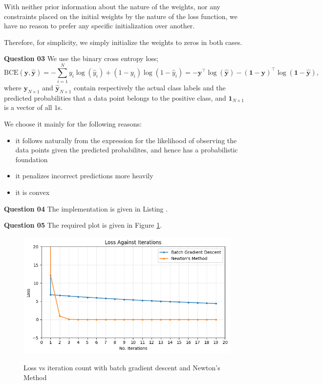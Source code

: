 \documentclass{article}[a4paper]
\begin{document}
	With neither prior information about the nature of the weights, nor any constraints placed on the initial weights by the nature of the loss function, we have no reason to prefer any specific initialization over another.
	
	Therefore, for simplicity, we simply initialize the weights to zeros in both cases.
	\medskip

	\textbf{Question 03} We use the binary cross entropy loss; \[
		\text{BCE}\left(\mathbf{y}, \hat{\mathbf{y}}\right)
		=
		-\sum_{i = 1}^N
			y_i \log\left( \hat{y}_i \right)
			+
			\left( 1 - y_i \right) \log\left( 1 - \hat{y}_i \right)
		=
		-\mathbf{y}^\top \log\left( \hat{\mathbf{y}} \right)
		-\left(\mathbf{1} - \mathbf{y}\right)^\top \log\left( \mathbf{1} - \hat{\mathbf{y}} \right),
	\]
	where $\mathbf{y}_{N \times 1}$ and $\hat{\mathbf{y}}_{N \times 1}$ contain respectively the actual class labels and the predicted probabilities that a data point belongs to the positive class, and $\mathbf{1}_{N \times 1}$ is a vector of all $1$s.

	We choose it mainly for the following reasons:
	\begin{itemize}[noitemsep]
		\item it follows naturally from the expression for the likelihood of observing the data points given the predicted probabilites, and hence has a probabilistic foundation
		\item it penalizes incorrect predictions more heavily
		\item it is convex
	\end{itemize}
	\medskip

	\textbf{Question 04} The implementation is given in Listing .
	\medskip

	\textbf{Question 05} The required plot is given in Figure \ref{q3_5_1}.

	\begin{figure}[H]
		\centering
		\includegraphics[width=0.8\linewidth]{images/q3_5_1.png}
		\label{q3_5_1}
		\caption{Loss vs iteration count with batch gradient descent and Newton's Method}
	\end{figure}
	
\end{document}
